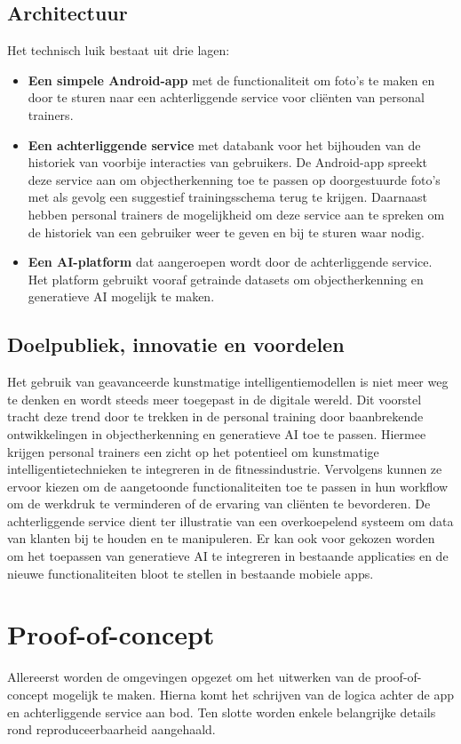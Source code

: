 \subsection{Architectuur}
\label{subsec:architectuur}
Het technisch luik bestaat uit drie lagen:
\begin{itemize}
    \item \textbf{Een simpele Android-app} met de functionaliteit om foto's te maken en door te sturen naar een achterliggende service voor cli\"enten van personal trainers.
    \item \textbf{Een achterliggende service} met databank voor het bijhouden van de historiek van voorbije interacties van gebruikers.
    De Android-app spreekt deze service aan om objectherkenning toe te passen op doorgestuurde foto's met als gevolg een suggestief trainingsschema terug te krijgen.
    Daarnaast hebben personal trainers de mogelijkheid om deze service aan te spreken om de historiek van een gebruiker weer te geven en bij te sturen waar nodig.
    \item \textbf{Een AI-platform} dat aangeroepen wordt door de achterliggende service.
    Het platform gebruikt vooraf getrainde datasets om objectherkenning en generatieve AI mogelijk te maken.
\end{itemize}

\subsection{Doelpubliek, innovatie en voordelen}
\label{subsec:doelpubliek}
Het gebruik van geavanceerde kunstmatige intelligentiemodellen is niet meer weg te denken en wordt steeds meer toegepast in de digitale wereld.
Dit voorstel tracht deze trend door te trekken in de personal training door baanbrekende ontwikkelingen in objectherkenning en generatieve AI toe te passen.
Hiermee krijgen personal trainers een zicht op het potentieel om kunstmatige intelligentietechnieken te integreren in de fitnessindustrie.
Vervolgens kunnen ze ervoor kiezen om de aangetoonde functionaliteiten toe te passen in hun workflow om de werkdruk te verminderen of de ervaring van cli\"enten te bevorderen.
De achterliggende service dient ter illustratie van een overkoepelend systeem om data van klanten bij te houden en te manipuleren.
Er kan ook voor gekozen worden om het toepassen van generatieve AI te integreren in bestaande applicaties en de nieuwe functionaliteiten bloot te stellen in bestaande mobiele apps.

\section{Proof-of-concept}
\label{sec:proof-of-concept}
Allereerst worden de omgevingen opgezet om het uitwerken van de proof-of-concept mogelijk te maken.
Hierna komt het schrijven van de logica achter de app en achterliggende service aan bod.
Ten slotte worden enkele belangrijke details rond reproduceerbaarheid aangehaald.

